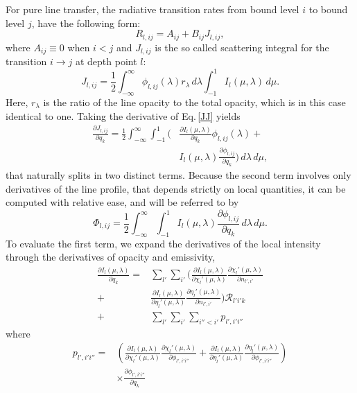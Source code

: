 \documentclass{aa}
\begin{document}
For pure line transfer, the radiative transition rates from bound level $i$ to bound level $j$, have the following form:
\begin{equation}
 R_{l,ij} = A_{ij} + B_{ij} J_{l,ij},
\end{equation}
where $A_{ij} \equiv 0$ when $i<j$ and $J_{l,ij}$ is the so called scattering integral for the transition $i\rightarrow j$ at depth point $l$:
\begin{equation}
 J_{l,ij} = \frac{1}{2} \int_{-\infty}^{\infty} \phi_{l,ij}(\lambda) r_{\lambda}\,d\lambda \int_{-1}^{1} I_l(\mu,\lambda)\,d\mu. 
 \label{JJ}
\end{equation}
Here, $r_{\lambda}$ is the ratio of the line opacity to the total opacity, which is in this case identical to one. Taking the derivative of Eq.\,\ref{JJ} yields
\begin{align}
 \frac{\partial J_{l,ij}}{\partial q_k} = \frac{1}{2} \int_{-\infty}^{\infty} \int_{-1}^{1} ( & \frac{\partial I_l(\mu,\lambda)}{\partial q_k} \phi_{l,ij}(\lambda) + \nonumber \\
 & I_l(\mu,\lambda) \frac{\partial \phi_{l,ij}}{\partial q_k} )\,d\lambda\,d\mu,
 \label{JJ2}
\end{align}
that naturally splits in two distinct terms. Because the second term involves only derivatives of the line profile, that depends strictly on local quantities, it can be computed with relative ease, and will be referred to by
\begin{equation}
\Phi_{l,ij} = \frac{1}{2} \int_{-\infty}^{\infty} \int_{-1}^{1} I_l(\mu,\lambda) \frac{\partial \phi_{l,ij}}{\partial q_k}\,d\lambda\,d\mu.
\end{equation}
To evaluate the first term, we expand the derivatives of the local intensity through the derivatives of opacity and emissivity,
\begin{align}
\frac{\partial I_l(\mu,\lambda)}{\partial q_k} = & \sum_{l'} \sum_{i'} ( \frac{\partial I_l(\mu,\lambda)}{\partial \chi_l'(\mu,\lambda)} \frac{\partial \chi_l'(\mu,\lambda)}{\partial n_{l',i'}} \nonumber \\
+& \frac{\partial I_l(\mu,\lambda)}{\partial \eta_l'(\mu,\lambda)} \frac{\partial \eta_l'(\mu,\lambda)}{\partial n_{l',i'}} ) {\mathcal R}_{l'i'k} \nonumber \\
+&  \sum_{l'} \sum_{i'} \sum_{i''<i'}  p_{l',i'i''}
\end{align}
where 
\begin{align}
 p_{l',i'i''} = &\left ( \frac{\partial I_l(\mu,\lambda)}{\partial \chi_l'(\mu,\lambda)} \frac{\partial \chi_l'(\mu,\lambda)}{\partial \phi_{l',i'i''}} + 
\frac{\partial I_l(\mu,\lambda)}{\partial \eta_l'(\mu,\lambda)} \frac{\partial \eta_l'(\mu,\lambda)}{\partial \phi_{l',i'i''}} \right )\nonumber \\
&\times \frac{\partial \phi_{l',i'i''}}{\partial q_k}
 \label{derI_inconcise}
\end{align}
\end{document}

